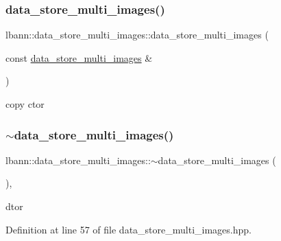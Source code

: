 \subsubsection{\texorpdfstring{data\+\_\+store\+\_\+multi\+\_\+images()}{data\_store\_multi\_images()}\hspace{0.1cm}{\footnotesize\ttfamily [2/2]}}
{\footnotesize\ttfamily lbann\+::data\+\_\+store\+\_\+multi\+\_\+images\+::data\+\_\+store\+\_\+multi\+\_\+images (\begin{DoxyParamCaption}\item[{const \hyperlink{classlbann_1_1data__store__multi__images}{data\+\_\+store\+\_\+multi\+\_\+images} \&}]{ }\end{DoxyParamCaption})\hspace{0.3cm}{\ttfamily [default]}}



copy ctor 

\mbox{\label{classlbann_1_1data__store__multi__images_addafae542acaa1ef218759030719b6d3}} 
\subsubsection{\texorpdfstring{$\sim$data\+\_\+store\+\_\+multi\+\_\+images()}{~data\_store\_multi\_images()}}
{\footnotesize\ttfamily lbann\+::data\+\_\+store\+\_\+multi\+\_\+images\+::$\sim$data\+\_\+store\+\_\+multi\+\_\+images (\begin{DoxyParamCaption}{ }\end{DoxyParamCaption})\hspace{0.3cm}{\ttfamily [inline]}, {\ttfamily [override]}}



dtor 



Definition at line 57 of file data\+\_\+store\+\_\+multi\+\_\+images.\+hpp.


